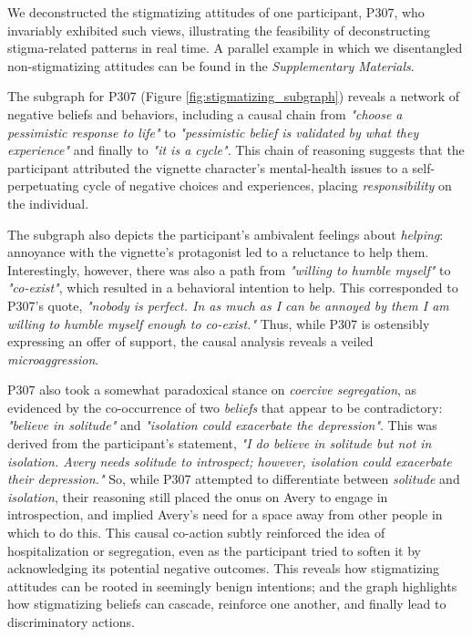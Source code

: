We deconstructed the stigmatizing attitudes of one participant, P307, who invariably exhibited such views, illustrating the feasibility of deconstructing stigma-related patterns in real time.
A parallel example in which we disentangled non-stigmatizing attitudes can be found in the \textit{Supplementary Materials}.


The subgraph for P307 (Figure \ref{fig:stigmatizing_subgraph}) reveals a network of negative beliefs and behaviors, including a causal chain from \textit{"choose a pessimistic response to life"} to \textit{"pessimistic belief is validated by what they experience"} and finally to \textit{"it is a cycle"}. 
This chain of reasoning suggests that the participant attributed the vignette character's mental-health issues to a self-perpetuating cycle of negative choices and experiences, placing \textit{responsibility} on the individual.


The subgraph also depicts the participant's ambivalent feelings about \textit{helping}: annoyance with the vignette's protagonist led to a reluctance to help them. 
Interestingly, however, there was also a path from \textit{"willing to humble myself"} to \textit{"co-exist"}, which resulted in a behavioral intention to help. 
This corresponded to P307's quote, \textit{"nobody is perfect. In as much as I can be annoyed by them I am willing to humble myself enough to co-exist."} 
Thus, while P307 is ostensibly expressing an offer of support, the causal analysis reveals a veiled \textit{microaggression}.



P307 also took a somewhat paradoxical stance on \textit{coercive segregation}, as evidenced by the co-occurrence of two \textit{beliefs} that appear to be contradictory: \textit{"believe in solitude"} and \textit{"isolation could exacerbate the depression"}. 
This was derived from the participant's statement, \textit{"I do believe in solitude but not in isolation. Avery needs solitude to introspect; however, isolation could exacerbate their depression."} 
So, while P307 attempted to differentiate between \textit{solitude} and \textit{isolation}, their reasoning still placed the onus on Avery to engage in introspection, and implied Avery's need for a space away from other people in which to do this. 
This causal co-action subtly reinforced the idea of hospitalization or segregation, even as the participant tried to soften it by acknowledging its potential negative outcomes. 
This reveals how stigmatizing attitudes can be rooted in seemingly benign intentions; and the graph highlights how stigmatizing beliefs can cascade, reinforce one another, and finally lead to discriminatory actions.




